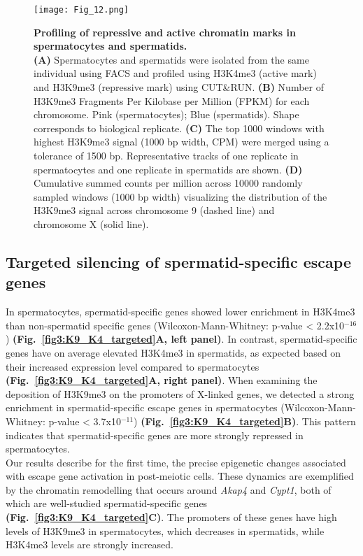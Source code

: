 \begin{figure}[!h]
\centering
\texttt{[image: Fig\_12.png]}
\caption[Chromatin profiling in spermatocytes and spermatids]{\textbf{Profiling of repressive and active chromatin marks in spermatocytes and spermatids.} \\
\textbf{(A)} Spermatocytes and spermatids were isolated from the same individual using FACS and profiled using H3K4me3 (active mark) and H3K9me3 (repressive mark) using CUT\&{}RUN. \textbf{(B)} Number of H3K9me3 Fragments Per Kilobase per Million (FPKM) for each chromosome. Pink (spermatocytes); Blue (spermatids). Shape corresponds to biological replicate. \textbf{(C)} The top 1000 windows with highest H3K9me3 signal (1000 bp width, CPM) were merged using a tolerance of 1500 bp. Representative tracks of one replicate in spermatocytes and one replicate in spermatids are shown. \textbf{(D)} Cumulative summed counts per million across 10000 randomly sampled windows (1000 bp width) visualizing the distribution of the H3K9me3 signal across chromosome 9 (dashed line) and chromosome X (solid line). 
}
\label{fig3:K9_global}
\end{figure}

\newpage

\subsection{Targeted silencing of spermatid-specific escape genes}

In spermatocytes, spermatid-specific genes showed lower enrichment in H3K4me3 than non-spermatid specific genes (Wilcoxon-Mann-Whitney: p-value < 2.2x10$^{-16}$) \textbf{(Fig.~\ref{fig3:K9_K4_targeted}A, left panel)}. In contrast, spermatid-specific genes have on average elevated H3K4me3 in spermatids, as expected based on their increased expression level compared to spermatocytes \textbf{(Fig.~\ref{fig3:K9_K4_targeted}A, right panel)}. When examining the deposition of H3K9me3 on the promoters of X-linked genes, we detected a strong enrichment in spermatid-specific escape genes in spermatocytes (Wilcoxon-Mann-Whitney: p-value < 3.7x10$^{-11}$) \textbf{(Fig.~\ref{fig3:K9_K4_targeted}B)}. This pattern indicates that spermatid-specific genes are more strongly repressed in spermatocytes. \\

Our results describe for the first time, the precise epigenetic changes associated with escape gene activation in post-meiotic cells. These dynamics are exemplified by the chromatin remodelling that occurs around \textit{Akap4} and \textit{Cypt1}, both of which are well-studied spermatid-specific genes \textbf{(Fig.~\ref{fig3:K9_K4_targeted}C)}. The promoters of these genes have high levels of H3K9me3 in spermatocytes, which decreases in spermatids, while H3K4me3 levels are strongly increased. 

